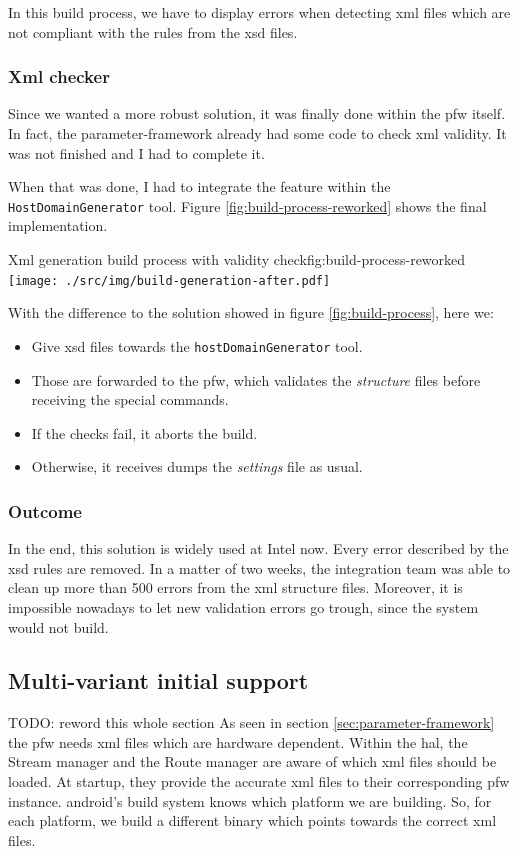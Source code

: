 In this build process, we have to display errors when detecting \gls{xml} files which are not compliant with the rules from the
\gls{xsd} files.

\subsubsection{Xml checker}

Since we wanted a more robust solution, it was finally done within the \gls{pfw} itself.
In fact, the parameter-framework already had some code to check \gls{xml} validity. It was not
finished and I had to complete it.

When that was done, I had to integrate the feature within the \lstinline{HostDomainGenerator} tool.
Figure \ref{fig:build-process-reworked} shows the final implementation.

\begin{figureGraphics}{Xml generation build process with validity check}{fig:build-process-reworked}
    \texttt{[image: ./src/img/build-generation-after.pdf]}
\end{figureGraphics}

With the difference to the solution showed in figure \ref{fig:build-process}, here we:
\begin{itemize}
    \item Give \gls{xsd} files towards the \lstinline{hostDomainGenerator} tool.
    \item Those are forwarded to the \gls{pfw}, which validates the \emph{structure} files before receiving the special commands.
    \item If the checks fail, it aborts the build.
    \item Otherwise, it receives dumps the \emph{settings} file as usual.
\end{itemize}

\subsubsection{Outcome}
In the end, this solution is widely used at Intel now. Every error described by the \gls{xsd} rules are removed.
In a matter of two weeks, the integration team was able to clean up more than 500 errors from the \gls{xml} structure files.
Moreover, it is impossible nowadays to let new validation errors go trough, since the system would not build.


\subsection{Multi-variant initial support}
TODO: reword this whole section
As seen in section \ref{sec:parameter-framework} the \gls{pfw} needs
\gls{xml} files which are hardware dependent.
Within the \gls{hal}, the Stream manager and the Route manager are aware of
which \gls{xml} files should be loaded. At startup, they provide the
accurate \gls{xml} files to their corresponding \gls{pfw} instance.
\gls{android}'s build system knows which platform we are building.
So, for each platform, we build a different binary which points towards the correct \gls{xml} files.

